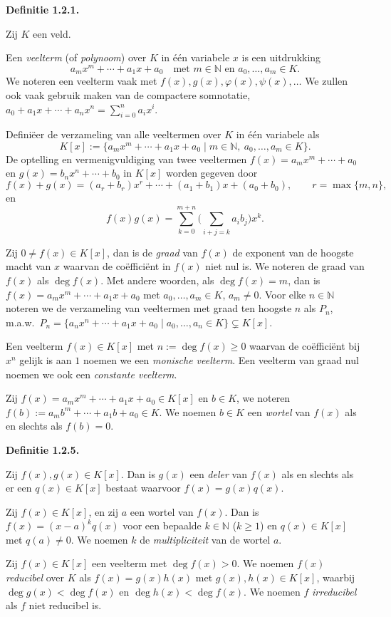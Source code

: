 \documentclass[10pt,a4paper]{article}
\newenvironment{res}[1]{%
  \par\noindent\textbf{Definitie #1.}~\ignorespaces
}{%
  \par\vspace{2pt}\normalfont
}
\begin{document}
\begin{res}{1.2.1}
Zij $K$ een veld.
\begin{myenum}
\item Een \textit{veelterm} (of \textit{polynoom}) over $K$ in \'e\'en variabele $x$ is een uitdrukking
\[
a_mx^m+\cdots+a_1x+a_0 \quad\text{met } m\in\mathbb N \text{ en } a_0,\dots,a_m\in K.
\]
We noteren een veelterm vaak met $f(x),g(x),\varphi(x),\psi(x),\dots$ We zullen ook vaak gebruik maken van de compactere somnotatie, $a_0+a_1x+\cdots+a_nx^n=\sum_{i=0}^n a_ix^i$.
\item Defini\"eer de verzameling van alle veeltermen over $K$ in \'e\'en variabele als
\[
K[x]:=\{a_mx^m+\cdots+a_1x+a_0 \mid m\in\mathbb N,\ a_0,\dots,a_m\in K\}.
\]
De optelling en vermenigvuldiging van twee veeltermen $f(x)=a_mx^m+\cdots+a_0$ en $g(x)=b_nx^n+\cdots+b_0$ in $K[x]$ worden gegeven door
\[
f(x)+g(x)=(a_r+b_r)x^r+\cdots+(a_1+b_1)x+(a_0+b_0), \qquad r=\max\{m,n\},
\]
en
\[
f(x)g(x)=\sum_{k=0}^{m+n}\Big(\sum_{i+j=k} a_ib_j\Big)x^k.
\]
\item Zij $0\ne f(x)\in K[x]$, dan is de \textit{graad} van $f(x)$ de exponent van de hoogste macht van $x$ waarvan de co\"effici\"ent in $f(x)$ niet nul is. We noteren de graad van $f(x)$ als $\deg f(x)$. Met andere woorden, als $\deg f(x)=m$, dan is $f(x)=a_mx^m+\cdots+a_1x+a_0$ met $a_0,\dots,a_m\in K$, $a_m\ne0$. Voor elke $n\in\mathbb N$ noteren we de verzameling van veeltermen met graad ten hoogste $n$ als $P_n$, m.a.w.\ $P_n=\{a_nx^n+\cdots+a_1x+a_0\mid a_0,\dots,a_n\in K\}\subsetneq K[x]$.
\item Een veelterm $f(x)\in K[x]$ met $n:=\deg f(x)\ge0$ waarvan de co\"effici\"ent bij $x^n$ gelijk is aan $1$ noemen we een \textit{monische veelterm}. Een veelterm van graad nul noemen we ook een \textit{constante veelterm}.
\item Zij $f(x)=a_mx^m+\cdots+a_1x+a_0\in K[x]$ en $b\in K$, we noteren $f(b):=a_mb^m+\cdots+a_1b+a_0\in K$. We noemen $b\in K$ een \textit{wortel} van $f(x)$ als en slechts als $f(b)=0$.
\end{myenum}
\end{res}

\begin{res}{1.2.5}
\begin{myenum}
\item Zij $f(x),g(x)\in K[x]$. Dan is $g(x)$ een \textit{deler} van $f(x)$ als en slechts als er een $q(x)\in K[x]$ bestaat waarvoor $f(x)=g(x)q(x)$.
\item Zij $f(x)\in K[x]$, en zij $a$ een wortel van $f(x)$. Dan is $f(x)=(x-a)^kq(x)$ voor een bepaalde $k\in\mathbb N$ ($k\ge1$) en $q(x)\in K[x]$ met $q(a)\ne0$. We noemen $k$ de \textit{multipliciteit} van de wortel $a$.
\item Zij $f(x)\in K[x]$ een veelterm met $\deg f(x)>0$. We noemen $f(x)$ \textit{reducibel} over $K$ als $f(x)=g(x)h(x)$ met $g(x),h(x)\in K[x]$, waarbij $\deg g(x)<\deg f(x)$ en $\deg h(x)<\deg f(x)$. We noemen $f$ \textit{irreducibel} als $f$ niet reducibel is.
\end{myenum}
\end{res}
\end{document}
